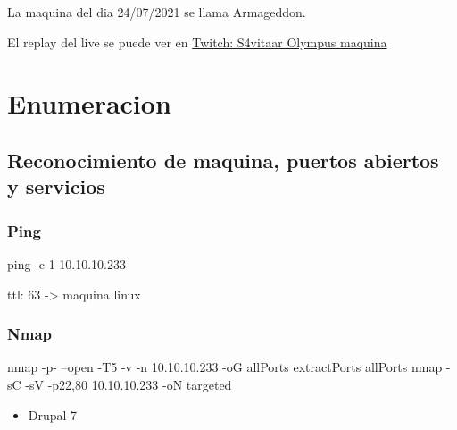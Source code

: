 \documentclass{assets/ipesethesis}
\newenvironment{Shaded}{\begin{snugshade}}{\end{snugshade}}
\newcommand{\ExtensionTok}[1]{#1}
\newcommand{\FunctionTok}[1]{\textcolor[rgb]{0.00,0.00,0.00}{#1}}
\newcommand{\NormalTok}[1]{#1}
\providecommand{\tightlist}{%
  \setlength{\itemsep}{0pt}\setlength{\parskip}{0pt}}
\begin{document}
La maquina del dia 24/07/2021 se llama Armageddon.

El replay del live se puede ver en \href{https://www.twitch.tv/videos/1096891939}{Twitch: S4vitaar Olympus maquina}

\hypertarget{enumeracion-2}{%
\section*{Enumeracion}\label{enumeracion-2}}

\hypertarget{reconocimiento-de-maquina-puertos-abiertos-y-servicios-2}{%
\subsection*{Reconocimiento de maquina, puertos abiertos y servicios}\label{reconocimiento-de-maquina-puertos-abiertos-y-servicios-2}}

\hypertarget{ping-2}{%
\subsubsection*{Ping}\label{ping-2}}

\begin{Shaded}
\begin{Highlighting}[]
\FunctionTok{ping}\NormalTok{ -c 1 10.10.10.233}
\end{Highlighting}
\end{Shaded}

ttl: 63 -\textgreater{} maquina linux

\hypertarget{nmap-2}{%
\subsubsection*{Nmap}\label{nmap-2}}

\begin{Shaded}
\begin{Highlighting}[]
\FunctionTok{nmap}\NormalTok{ -p- --open -T5 -v -n 10.10.10.233 -oG allPorts}
\ExtensionTok{extractPorts}\NormalTok{ allPorts}
\FunctionTok{nmap}\NormalTok{ -sC -sV -p22,80 10.10.10.233 -oN targeted}
\end{Highlighting}
\end{Shaded}

\begin{itemize}
\tightlist
\item
  Drupal 7
\end{itemize}
\end{document}
